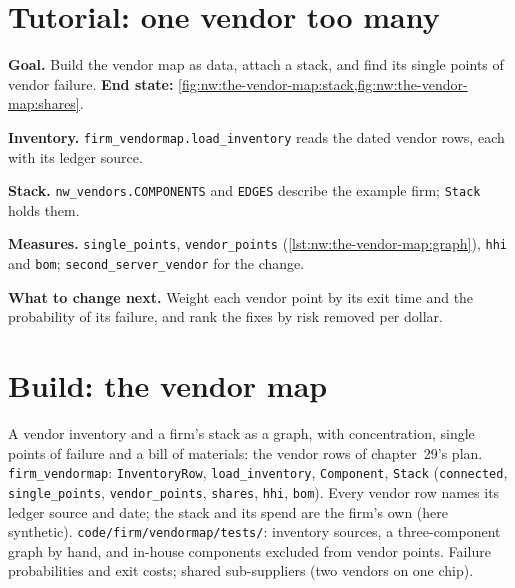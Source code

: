 \section{Tutorial: one vendor too many}\label{tut:nw:the-vendor-map:tut}

\begin{tutorial}
\textbf{Goal.} Build the vendor map as data, attach a stack, and find its single points of vendor failure.
\textbf{End state:} \cref{fig:nw:the-vendor-map:stack,fig:nw:the-vendor-map:shares}.
\begin{tutsteps}
\item \textbf{Inventory.} \texttt{firm\_vendormap.load\_inventory} reads the dated vendor rows, each with its ledger source.
\item \textbf{Stack.} \texttt{nw\_vendors.COMPONENTS} and \texttt{EDGES} describe the example firm; \texttt{Stack} holds them.
\item \textbf{Measures.} \texttt{single\_points}, \texttt{vendor\_points} (\cref{lst:nw:the-vendor-map:graph}), \texttt{hhi} and
  \texttt{bom}; \texttt{second\_server\_vendor} for the change.
\end{tutsteps}
\textbf{What to change next.} Weight each vendor point by its exit time and the probability of its failure, and rank the fixes by
risk removed per dollar.
\end{tutorial}

\section{Build: the vendor map}\label{bld:nw:the-vendor-map:vendormap}

\begin{build}
 A vendor inventory and a firm's stack as a graph, with concentration, single points of failure and a bill of
materials: the vendor rows of chapter~29's plan.
 \texttt{firm\_vendormap}: \texttt{InventoryRow}, \texttt{load\_inventory}, \texttt{Component}, \texttt{Stack}
(\texttt{connected}, \texttt{single\_points}, \texttt{vendor\_points}, \texttt{shares}, \texttt{hhi}, \texttt{bom}).
 Every vendor row names its ledger source and date; the stack and its spend are the firm's own (here synthetic).
 \texttt{code/firm/vendormap/tests/}: inventory sources, a three-component graph by hand, and in-house
components excluded from vendor points.
 Failure probabilities and exit costs; shared sub-suppliers (two vendors on one chip).
\end{build}

